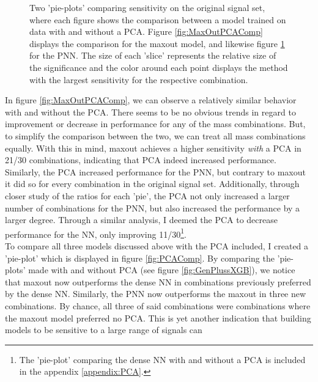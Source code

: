 \begin{figure}
{\begin{subfigure}{.6\textwidth}
        \vspace{-.75cm}
        \caption{}
        \label{fig:PNNPCAComp}
    \end{subfigure}
    }
    \caption[Two 'pie-plots 'comparing the sensitivity on the original signal set, where each figure shows the comparison between a model (maxout and \acs{PNN}) training on data 
    with and without a \acs{PCA}.]{Two 'pie-plots' comparing sensitivity on the original signal set, where each figure shows the comparison between a model trained on data 
    with and without a \ac{PCA}. Figure \ref{fig:MaxOutPCAComp} displays the comparison for the maxout model, and likewise figure \ref{fig:PNNPCAComp} 
    for the \ac{PNN}. The size of each 'slice' represents the relative size of the significance and the color around each 
    point displays the method with the largest sensitivity for the respective combination.}
    \label{fig:PCAComp2}
\end{figure}
In figure \ref{fig:MaxOutPCAComp}, we can observe a relatively similar behavior with and without the \ac{PCA}. There seems to be no obvious trends in regard 
to improvement or decrease in performance for any of the mass combinations. But, to simplify the comparison between the two, we can treat all mass combinations
equally. With this in mind, maxout achieves a higher sensitivity \emph{with} a \ac{PCA} in 21/30 combinations, indicating that \ac{PCA} indeed increased performance.
Similarly, the \ac{PCA} increased performance for the \ac{PNN}, but contrary to maxout it did so for every combination in the original signal set. Additionally,
through closer study of the ratios for each 'pie', the \ac{PCA} not only increased a larger number of combinations for the \ac{PNN}, but also increased the performance
by a larger degree. Through a similar analysis, I deemed the \ac{PCA} to decrease performance for the \ac{NN}, only improving 11/30\footnote{The 'pie-plot' comparing the 
dense \ac{NN} with and without a \ac{PCA} is included in the appendix \ref{appendix:PCA}.}. 
\\
To compare all three models discussed above with the \ac{PCA} included, I created a 'pie-plot' which is displayed in figure \ref{fig:PCAComp}. By comparing 
the 'pie-plots' made with and without \ac{PCA} (see figure \ref{fig:GenPlussXGB}), we notice that maxout now outperforms the dense \ac{NN} in combinations 
previously preferred by the dense \ac{NN}. Similarly, the \ac{PNN} now outperforms the maxout in three new combinations. By chance, all three of said combinations 
were combinations where the maxout model preferred no \ac{PCA}. This is yet another indication that building models to be sensitive to a large range of signals can 
